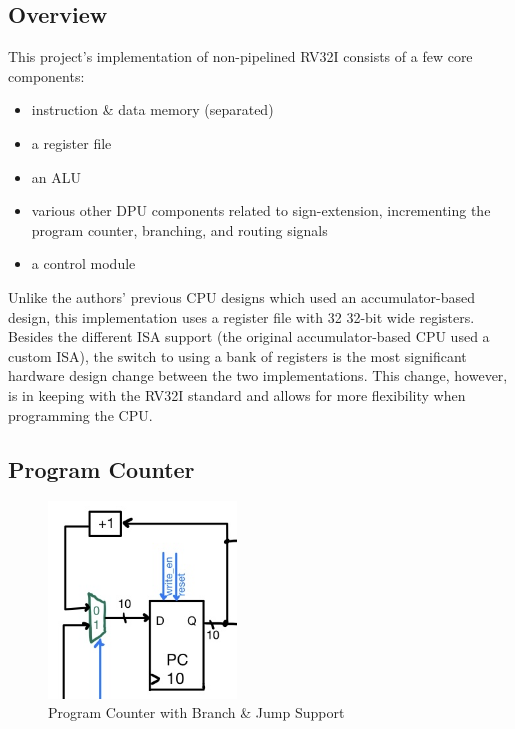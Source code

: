 \documentclass[lettersize,journal]{IEEEtran}
\begin{document}
\subsection{Overview}
This project's implementation of non-pipelined RV32I consists of a few core components:
\begin{itemize}
    \item instruction \& data memory (separated)
    \item a register file
    \item an ALU
    \item various other DPU components related to sign-extension, incrementing the program counter, branching, and routing signals
    \item a control module
\end{itemize}

Unlike the authors' previous CPU designs which used an accumulator-based design, 
this implementation uses a register file with 32 32-bit wide registers.
Besides the different ISA support (the original accumulator-based CPU used a custom ISA),
the switch to using a bank of registers is the most significant hardware design change between the two implementations.
This change, however, is in keeping with the RV32I standard and allows for more flexibility when programming the CPU.

\subsection{Program Counter}
\begin{figure}[!h]
  \label{fig:pc}
  \centering
  \includegraphics[width=5cm]{PC.jpg}
  \caption{Program Counter with Branch \& Jump Support}
\end{figure}
\end{document}
